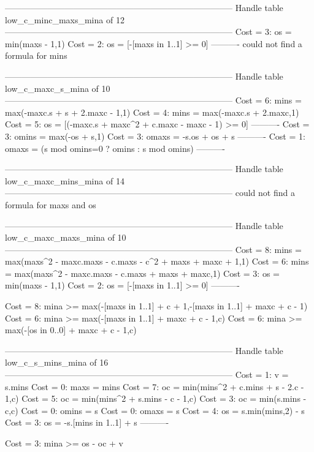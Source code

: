 --------------------------------------------------------------------------------
Handle table low_c_minc_maxs_mina of 12
--------------------------------------------------------------------------------
Cost =  3:  os   = min(maxs - 1,1)
Cost =  2:  os   = [-[maxs in 1..1] >= 0]
----------
could not find a formula for mins


--------------------------------------------------------------------------------
Handle table low_c_maxc_s_mina of 10
--------------------------------------------------------------------------------
Cost =  6:  mins  = max(-maxc.s + s + 2.maxc - 1,1)
Cost =  4:  mins  = max(-maxc.s + 2.maxc,1)
Cost =  5:  os    = [(-maxc.s + maxc^2 + c.maxc - maxc - 1) >= 0]
----------
Cost =  3:  omins = max(-os + s,1)
Cost =  3:  omaxs = -s.os + os + s
----------
Cost =  1:  omaxs = (s mod omins=0 ? omins : s mod omins)
----------


--------------------------------------------------------------------------------
Handle table low_c_maxc_mins_mina of 14
--------------------------------------------------------------------------------
could not find a formula for maxs and os


--------------------------------------------------------------------------------
Handle table low_c_maxc_maxs_mina of 10
--------------------------------------------------------------------------------
Cost =  8:  mins = max(maxs^2 - maxc.maxs - c.maxs - c^2 + maxs + maxc + 1,1)
Cost =  6:  mins = max(maxs^2 - maxc.maxs - c.maxs + maxs + maxc,1)
Cost =  3:  os   = min(maxs - 1,1)
Cost =  2:  os   = [-[maxs in 1..1] >= 0]
----------

Cost =  8:  mina >= max(-[maxs in 1..1] + c + 1,-[maxs in 1..1] + maxc + c - 1)
Cost =  6:  mina >= max(-[maxs in 1..1] + maxc + c - 1,c)
Cost =  6:  mina >= max(-[os in 0..0] + maxc + c - 1,c)

--------------------------------------------------------------------------------
Handle table low_c_s_mins_mina of 16
--------------------------------------------------------------------------------
Cost =  1:  v     = s.mins
Cost =  0:  maxs  = mins
Cost =  7:  oc    = min(mins^2 + c.mins + s - 2.c - 1,c)
Cost =  5:  oc    = min(mins^2 + s.mins - c - 1,c)
Cost =  3:  oc    = min(s.mins - c,c)
Cost =  0:  omins = s
Cost =  0:  omaxs = s
Cost =  4:  os    = s.min(mins,2) - s
Cost =  3:  os    = -s.[mins in 1..1] + s
----------

Cost =  3:  mina >= os - oc + v

